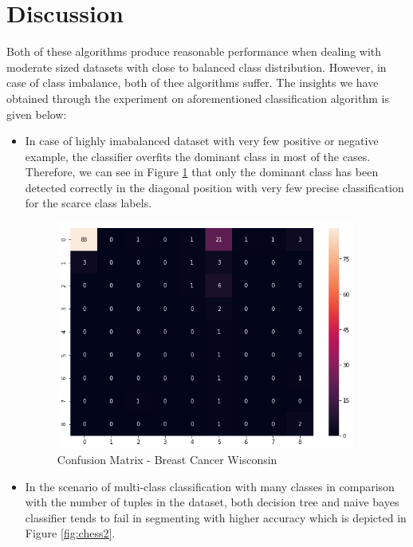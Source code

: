 \documentclass[12pt]{article}
\begin{document}
\section{Discussion}
Both of these algorithms produce reasonable performance when dealing with moderate sized datasets with close to balanced class distribution. However, in case of class imbalance, both of thee algorithms suffer. The insights we have obtained through the experiment on aforementioned classification algorithm is given below:

\begin{itemize}
	\item In case of highly imabalanced dataset with very few positive or negative example, the classifier overfits the dominant class in most of the cases. Therefore, we can see in Figure \ref{fig:BreastCancerWisconsin} that only the dominant class has been detected correctly in the diagonal position with very few precise classification for the scarce class labels.


\begin{figure}[H]
	\centering
	\includegraphics[width = .7\columnwidth, height = 7.5cm]{BreastCancerWisconsin.png}
	\caption{Confusion Matrix - Breast Cancer Wisconsin}
	\label{fig:BreastCancerWisconsin}
\end{figure}

\item In the scenario of multi-class classification with many classes in comparison with the number of tuples in the dataset, both decision tree and naive bayes classifier tends to fail in segmenting with higher accuracy which is depicted in Figure \ref{fig:chess2}.  


\end{itemize}
\end{document}
